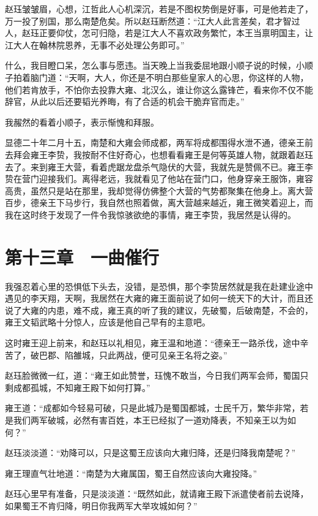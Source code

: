 赵珏皱皱眉，心想，江哲此人心机深沉，若是不图权势倒是好事，可是他若走了，万一投了别国，那么南楚危矣。所以赵珏断然道：“江大人此言差矣，君才智过人，赵珏正要仰仗，怎可归隐，若是江大人不喜欢政务繁忙，本王当禀明国主，让江大人在翰林院恩养，无事不必处理公务即可。”

什么，我目瞪口呆，怎么事与愿违。当天晚上当我委屈地跟小顺子说的时候，小顺子拍着脑门道：“天啊，大人，你还是不明白那些皇家人的心思，你这样的人物，他们若肯放手，不怕你去投靠大雍、北汉么，谁让你这么露锋芒，看来你不仅不能辞官，从此以后还要韬光养晦，有了合适的机会干脆弃官而走。”

我赧然的看着小顺子，表示惭愧和拜服。

显德二十年二月十五，南楚和大雍会师成都，两军将成都围得水泄不通，德亲王前去拜会雍王李贽，我按耐不住好奇心，也想看看雍王是何等英雄人物，就跟着赵珏去了。来到雍王大营，看着虎踞龙盘杀气隐伏的大营，我就先是赞佩不已。雍王李贽在营门迎接我们。离得老远，我就看见了他站在营门口，他身穿亲王服饰，雍容高贵，虽然只是站在那里，我却觉得仿佛整个大营的气势都聚集在他身上。离大营百步，德亲王下马步行，我自然也照着做，离大营越来越近，雍王微笑着迎上，而我在这时终于发现了一件令我惊骇欲绝的事情，雍王李贽，我居然是认得的。

\chapter{第十三章　一曲催行}

我强忍着心里的恐惧低下头去，没错，是恐惧，那个李贽居然就是我在赴建业途中遇见的李天翔，天啊，我居然在大雍的雍王面前说了如何一统天下的大计，而且还说了大雍的内患，难不成，雍王真的听了我的建议，先破蜀，后破南楚，不会的，雍王文韬武略十分惊人，应该是他自己早有的主意吧。

这时雍王迎上前来，和赵珏以礼相见，雍王温和地道：“德亲王一路杀伐，途中辛苦了，破巴郡、陷雒城，只此两战，便可见亲王名将之姿。”

赵珏脸微微一红，道：“雍王如此赞誉，珏愧不敢当，今日我们两军会师，蜀国只剩成都孤城，不知雍王殿下如何打算。”

雍王道：“成都如今轻易可破，只是此城乃是蜀国都城，士民千万，繁华非常，若是我们两军破城，必然有害百姓，本王已经拟了一道劝降表，不知亲王以为如何？”

赵珏淡淡道：“劝降可以，只是这蜀王应该向大雍归降，还是归降我南楚呢？”

雍王理直气壮地道：“南楚为大雍属国，蜀王自然应该向大雍投降。”

赵珏心里早有准备，只是淡淡道：“既然如此，就请雍王殿下派遣使者前去说降，如果蜀王不肯归降，明日你我两军大举攻城如何？”

